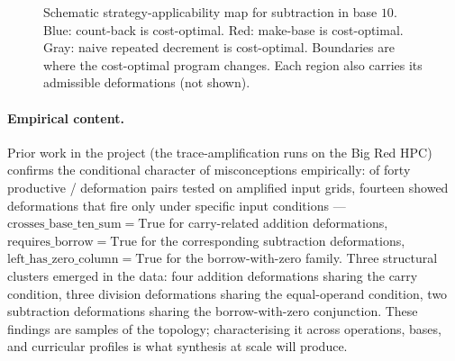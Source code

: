 \documentclass[11pt]{article}
\begin{document}
\begin{figure}[t]
\centering
{}
\caption{Schematic strategy-applicability map for subtraction in base
$10$. Blue: count-back is cost-optimal. Red: make-base is cost-optimal.
Gray: naive repeated decrement is cost-optimal. Boundaries are where
the cost-optimal program changes. Each region also carries its
admissible deformations (not shown).}
\label{fig:topology}
\end{figure}

\paragraph{Empirical content.} Prior work in the project (the
trace-amplification runs on the Big Red HPC) confirms the conditional
character of misconceptions empirically: of forty productive /
deformation pairs tested on amplified input grids, fourteen showed
deformations that fire only under specific input conditions —
$\mathrm{crosses\_base\_ten\_sum} = \mathrm{True}$ for carry-related
addition deformations, $\mathrm{requires\_borrow} = \mathrm{True}$ for
the corresponding subtraction deformations, $\mathrm{left\_has\_zero\_
column} = \mathrm{True}$ for the borrow-with-zero family. Three
structural clusters emerged in the data: four addition deformations
sharing the carry condition, three division deformations sharing the
equal-operand condition, two subtraction deformations sharing the
borrow-with-zero conjunction. These findings are samples of the
topology; characterising it across operations, bases, and curricular
profiles is what synthesis at scale will produce.
\end{document}
